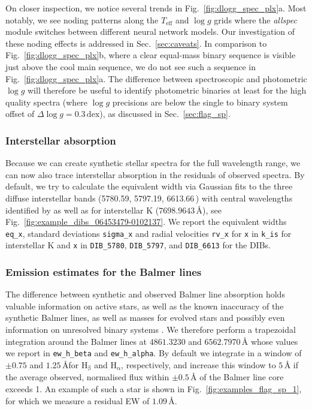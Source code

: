 \documentclass[
  journal=pasa,
  manuscript=research-paper, %
  year=2024,
  volume=37
]{cup-journal}
\newcommand{\Teff}{$T_\mathrm{eff}$\xspace}
\newcommand{\logg}{$\log g$\xspace}
\newcommand{\Angstroem}{\,\text{\AA}}	%
\begin{document}
On closer inspection, we notice several trends in Fig.~\ref{fig:dlogg_spec_plx}a. Most notably, we see noding patterns along the \Teff and \logg grids where the \textit{allspec} module switches between different neural network models. Our investigation of these noding effects is addressed in Sec.~\ref{sec:caveats}. In comparison to Fig.~\ref{fig:dlogg_spec_plx}b, where a clear equal-mass binary sequence is visible just above the cool main sequence, we do not see such a sequence in Fig.~\ref{fig:dlogg_spec_plx}a. The difference between spectroscopic and photometric \logg will therefore be useful to identify photometric binaries at least for the high quality spectra (where \logg precisions are below the single to binary system offset of $\Delta \log g = 0.3\,\mathrm{dex}$), as discussed in Sec.~\ref{sec:flag_sp}.

\subsubsection{Interstellar absorption}

Because we can create synthetic stellar spectra for the full wavelength range, we can now also trace interstellar absorption in the residuals of observed spectra. By default, we try to calculate the equivalent width via Gaussian fits to the three diffuse interstellar bands (5780.59, 5797.19, 6613.66\Angstroem) with central wavelengths identified by \citet{Vogrincic2023} as well as for interstellar K ($7698.9643\,\text{\AA}$), see Fig.~\ref{fig:example_dibs_06453479-0102137}. We report the equivalent widths \texttt{eq\_x}, standard deviations \texttt{sigma\_x} and radial velocities \texttt{rv\_x} for \texttt{x} in \texttt{k\_is} for interstellar K and \texttt{x} in \texttt{DIB\_5780}, \texttt{DIB\_5797}, and \texttt{DIB\_6613} for the DIBs.

\subsubsection{Emission estimates for the Balmer lines}

The difference between synthetic and observed Balmer line absorption holds valuable information on active stars, as well as the known inaccuracy of the synthetic Balmer lines, as well as masses for evolved stars \citep{Bergemann2016} and possibly even information on unresolved binary systems \citep{Sayeed2024}. We therefore perform a trapezoidal integration around the Balmer lines at $4861.3230$ and $6562.7970\,\text{\AA}$ whose values we report in \texttt{ew\_h\_beta} and \texttt{ew\_h\_alpha}. By default we integrate in a window of $\pm 0.75$ and $1.25\,\text{\AA}$for $\text{H}_\upbeta$ and $\text{H}_\upalpha$, respectively, and increase this window to $5\,\text{\AA}$ if the average observed, normalised flux within $\pm 0.5\,\text{\AA}$ of the Balmer line core exceeds 1. An example of such a star is shown in Fig.~\ref{fig:examples_flag_sp_1}, for which we measure a residual EW of $1.09\,\text{\AA}$.
\end{document}
